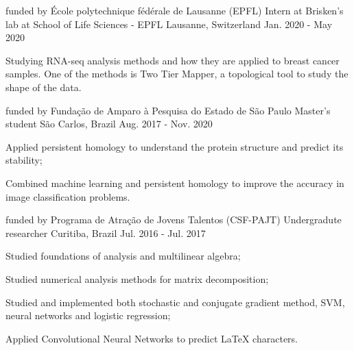 

\begin{cventries}

  \cventry
    {funded by École polytechnique fédérale de Lausanne (EPFL)}
    {Intern at Brisken's lab at School of Life Sciences - EPFL}
    {Lausanne, Switzerland} 
    {Jan. 2020 - May 2020} 
    {
      \begin{cvitems} 
        \item {Studying RNA-seq analysis methods and how they are applied 
            to breast cancer samples. One of the methods is 
            Two Tier Mapper, a topological tool to study the shape of the data.}
      \end{cvitems} 
    }
  \cventry
    {funded by Fundação de Amparo à Pesquisa do Estado de São Paulo} %
    {Master's student} %
    {São Carlos, Brazil} %
    {Aug. 2017 - Nov. 2020} %
    {
      \begin{cvitems} %
        \item {Applied persistent homology to understand the protein structure
        and predict its stability;}
        \item {Combined machine learning and persistent homology to improve
        the accuracy in image classification problems.}
      \end{cvitems}
    }

\cventry
  {funded by Programa de Atração de Jovens Talentos (CSF-PAJT)} %
  {Undergradute researcher} %
  {Curitiba, Brazil} %
  {Jul. 2016 - Jul. 2017} %
  {
    \begin{cvitems} %
      \item {Studied foundations of analysis and multilinear algebra;}
      \item {Studied numerical analysis methods for matrix decomposition;}
      \item {Studied and implemented both stochastic and conjugate gradient
      method, SVM, neural networks and logistic regression;}
      \item {Applied Convolutional Neural Networks to predict LaTeX characters.}
    \end{cvitems}
  }

\end{cventries}
